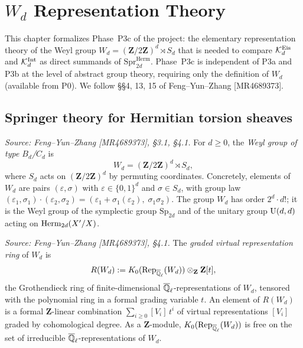 \chapter{\texorpdfstring{$W_d$}{Wd} Representation Theory}
\label{chap:wd-representations}

This chapter formalizes Phase~P3c of the project: the elementary representation theory of
the Weyl group \(W_d = (\mathbf{Z}/2\mathbf{Z})^d \rtimes S_d\) that is needed to compare
\(\mathcal{K}_d^{\mathrm{Eis}}\) and \(\mathcal{K}_d^{\mathrm{Int}}\) as direct summands of
\(\mathrm{Spr}^{\mathrm{Herm}}_{2d}\). Phase~P3c is independent of P3a and P3b at the
level of abstract group theory, requiring only the definition of \(W_d\) (available from P0).
We follow \S\S4, 13, 15 of Feng--Yun--Zhang [MR4689373].

\section{Springer theory for Hermitian torsion sheaves}

\begin{definition}
  \label{def:W-d-group}
  \textit{Source: Feng--Yun--Zhang [MR4689373], \S3.1, \S4.1.}
  For \(d \geq 0\), the \emph{Weyl group of type \(B_d\)/\(C_d\)} is
  \[
    W_d = (\mathbf{Z}/2\mathbf{Z})^d \rtimes S_d,
  \]
  where \(S_d\) acts on \((\mathbf{Z}/2\mathbf{Z})^d\) by permuting coordinates.
  Concretely, elements of \(W_d\) are pairs \((\varepsilon, \sigma)\) with
  \(\varepsilon \in \{0,1\}^d\) and \(\sigma \in S_d\), with group law
  \((\varepsilon_1, \sigma_1) \cdot (\varepsilon_2, \sigma_2) =
  (\varepsilon_1 + \sigma_1(\varepsilon_2),\; \sigma_1 \sigma_2)\).
  The group \(W_d\) has order \(2^d \cdot d!\); it is the Weyl group of the
  symplectic group \(\mathrm{Sp}_{2d}\) and of the unitary group
  \(\operatorname{U}(d,d)\) acting on \(\operatorname{Herm}_{2d}(X'/X)\).
\end{definition}

\begin{definition}
  \label{def:wd-rep-ring}
  \textit{Source: Feng--Yun--Zhang [MR4689373], \S4.1.}
  The \emph{graded virtual representation ring} of \(W_d\) is
  \[
    R(W_d) := K_0(\operatorname{Rep}_{\overline{\mathbb{Q}}_\ell}(W_d)) \otimes_{\mathbf{Z}} \mathbf{Z}[t],
  \]
  the Grothendieck ring of finite-dimensional \(\overline{\mathbb{Q}}_\ell\)-representations of \(W_d\),
  tensored with the polynomial ring in a formal grading variable \(t\). An element
  of \(R(W_d)\) is a formal \(\mathbf{Z}\)-linear combination
  \(\sum_{i \geq 0} [V_i]\, t^i\) of virtual representations \([V_i]\) graded by
  cohomological degree.
  As a \(\mathbf{Z}\)-module, \(K_0(\operatorname{Rep}_{\overline{\mathbb{Q}}_\ell}(W_d))\) is free on the set of
  irreducible \(\overline{\mathbb{Q}}_\ell\)-representations of \(W_d\).
\end{definition}

